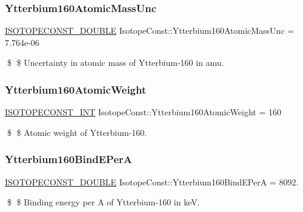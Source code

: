 \subsubsection{\texorpdfstring{Ytterbium160\+Atomic\+Mass\+Unc}{Ytterbium160AtomicMassUnc}}
{\footnotesize\ttfamily \mbox{\hyperlink{group___isotope_const-_macros_ga8f45a7272ce02c0b4c65c44636ed719a}{I\+S\+O\+T\+O\+P\+E\+C\+O\+N\+S\+T\+\_\+\+D\+O\+U\+B\+LE}} Isotope\+Const\+::\+Ytterbium160\+Atomic\+Mass\+Unc = 7.\+764e-\/06}

\$ \$ Uncertainty in atomic mass of Ytterbium-\/160 in amu. \mbox{\label{group___isotope_const-_ytterbium-_yb160_ga20f7f8f4f40c8ba1d57d38c24bb5c6d0}} 
\subsubsection{\texorpdfstring{Ytterbium160\+Atomic\+Weight}{Ytterbium160AtomicWeight}}
{\footnotesize\ttfamily \mbox{\hyperlink{group___isotope_const-_macros_ga5f18360b3e99483a35c32d789e62621c}{I\+S\+O\+T\+O\+P\+E\+C\+O\+N\+S\+T\+\_\+\+I\+NT}} Isotope\+Const\+::\+Ytterbium160\+Atomic\+Weight = 160}

\$ \$ Atomic weight of Ytterbium-\/160. \mbox{\label{group___isotope_const-_ytterbium-_yb160_ga0da5aeedfa6801924ba3e649cae5803a}} 
\subsubsection{\texorpdfstring{Ytterbium160\+Bind\+E\+PerA}{Ytterbium160BindEPerA}}
{\footnotesize\ttfamily \mbox{\hyperlink{group___isotope_const-_macros_ga8f45a7272ce02c0b4c65c44636ed719a}{I\+S\+O\+T\+O\+P\+E\+C\+O\+N\+S\+T\+\_\+\+D\+O\+U\+B\+LE}} Isotope\+Const\+::\+Ytterbium160\+Bind\+E\+PerA = 8092.}

\$ \$ Binding energy per A of Ytterbium-\/160 in keV. \mbox{\label{group___isotope_const-_ytterbium-_yb160_ga80a08a307ee1329e34cacc631e65f078}} 
